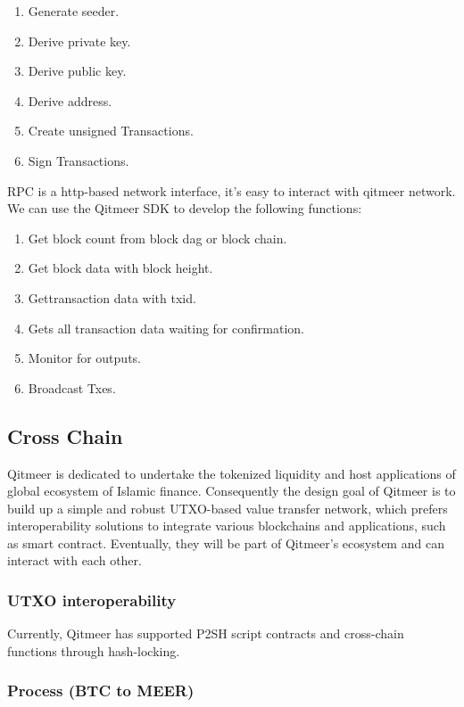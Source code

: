 \documentclass[a4paper,11pt]{article}
\begin{document}
   \begin{enumerate}
     \item Generate seeder.
     \item Derive private key.
     \item Derive public key.
     \item Derive address.
     \item Create unsigned Transactions.
	 \item Sign Transactions.
   \end{enumerate}

   RPC is a http-based network interface, it’s easy to interact with qitmeer network. We can use the Qitmeer SDK to develop the following functions:

   \begin{enumerate}
    \item  Get block count from block dag or block chain.
    \item Get block data with block height.
    \item  Gettransaction data with txid.
    \item  Gets all transaction data waiting for confirmation.
    \item  Monitor for outputs.
    \item  Broadcast Txes.
   \end{enumerate}


\subsection{Cross Chain}
Qitmeer is dedicated to undertake the tokenized liquidity and host applications of global ecosystem of Islamic finance. Consequently the design goal of Qitmeer is to build up a simple and robust UTXO-based value transfer network, which prefers interoperability solutions to integrate various blockchains and applications, such as smart contract. Eventually, they will be part of Qitmeer’s ecosystem and can interact with each other.

\subsubsection{UTXO interoperability}
Currently, Qitmeer has supported P2SH script contracts and cross-chain functions through hash-locking.

\subsubsection*{Process (BTC to MEER)}
\end{document}
